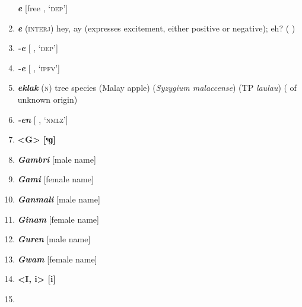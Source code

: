 \begin{enumerate}[noitemsep, label={}, align=left, widest=190, labelsep=1ex,leftmargin=*,itemindent=-10pt]
\textbf{\textit{e}} [free , ‘\textsc{dep}’] \item 
\textbf{\textit{e}} (\textsc{interj}) hey, ay (expresses excitement, either positive or negative); eh? ( ) \item 
\textbf{\textit{-e}} [ , ‘\textsc{dep}’] \item 
\textbf{\textit{-e}} [ , ‘\textsc{ipfv}’] \item 
\textbf{\textit{eklak}} (\textsc{n}) tree species (Malay apple) (\textit{Syzygium malaccense}) (TP \textit{laulau}) ( of unknown origin) \item 
\textbf{\textit{-en}} [ , ‘\textsc{nmlz}’]\\ \item

\newpage

\noindent \textbf{<G>        [ᵑɡ]}\\ \item

\textbf{\textit{Gambri}} [male name] \item 
\textbf{\textit{Gami}} [female name] \item 
\textbf{\textit{Ganmali}} [male name] \item 
\textbf{\textit{Ginam}} [female name] \item 
\textbf{\textit{Guren}} [male name] \item 
\textbf{\textit{Gwam}} [female name]\\ \item

\noindent \textbf{<I, i>        [i]}\\ \item


\end{enumerate}
